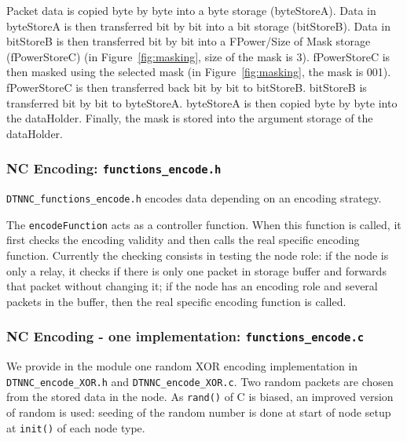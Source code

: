 \documentclass[a4paper,twoside]{article}
\begin{document}
Packet data is copied byte by byte into a byte storage (byteStoreA). Data in byteStoreA is then transferred bit by bit into a bit storage (bitStoreB). Data in bitStoreB is then transferred bit by bit into a FPower/Size of Mask storage (fPowerStoreC) (in Figure~\ref{fig:masking}, size of the mask is 3). fPowerStoreC is then masked using the selected mask (in Figure~\ref{fig:masking}, the mask is 001). fPowerStoreC is then transferred back bit by bit to bitStoreB. bitStoreB is transferred bit by bit to byteStoreA. byteStoreA is then copied byte by byte into the dataHolder. Finally, the mask is stored into the argument storage of the dataHolder.

\subsubsection{NC Encoding: \texttt{functions\_encode.h}}

\texttt{DTNNC\_functions\_encode.h} encodes data depending on an encoding strategy.
	
The \texttt{encodeFunction} acts as a controller function. When this function is called, it first checks the encoding validity and then calls the real specific encoding function. Currently the checking consists in testing the node role: if the node is only a relay, it checks if there is only one packet in storage buffer and forwards that packet without changing it; if the node has an encoding role and several packets in the buffer, then the real specific encoding function is called.



\subsubsection{NC Encoding - one implementation: \texttt{functions\_encode.c}}

We provide in the module one random XOR encoding implementation in \texttt{DTNNC\_encode\_XOR.h} and \texttt{DTNNC\_encode\_XOR.c}. Two random packets are chosen from the stored data in the node. As \texttt{rand()} of C is biased, an improved version of random is used: seeding of the random number is done at start of node setup at \texttt{init()} of each node type.


\end{document}
